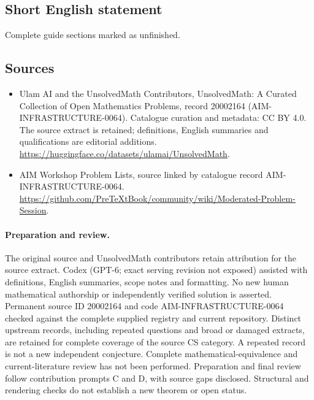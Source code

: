 \documentclass[11pt]{article}
\begin{document}
\subsection{Short English statement}
Complete guide sections marked as unfinished.
\subsection{Sources}
\begin{itemize}
\item[\hypertarget{source:20002164:1}{S1}] Ulam AI and the UnsolvedMath Contributors, UnsolvedMath: A Curated Collection of Open Mathematics Problems, record 20002164 (AIM-INFRASTRUCTURE-0064). Catalogue curation and metadata: CC BY 4.0. The source extract is retained; definitions, English summaries and qualifications are editorial additions.
\url{https://huggingface.co/datasets/ulamai/UnsolvedMath}.
\item[\hypertarget{source:20002164:2}{S2}] AIM Workshop Problem Lists, source linked by catalogue record AIM-INFRASTRUCTURE-0064.
\url{https://github.com/PreTeXtBook/community/wiki/Moderated-Problem-Session}.
\end{itemize}
\paragraph{Preparation and review.}
The original source and UnsolvedMath contributors retain attribution for the source extract. Codex (GPT-6; exact serving revision not exposed) assisted with definitions, English summaries, scope notes and formatting. No new human mathematical authorship or independently verified solution is asserted. Permanent source ID 20002164 and code AIM-INFRASTRUCTURE-0064 checked against the complete supplied registry and current repository. Distinct upstream records, including repeated questions and broad or damaged extracts, are retained for complete coverage of the source CS category. A repeated record is not a new independent conjecture. Complete mathematical-equivalence and current-literature review has not been performed. Preparation and final review follow contribution prompts C and D, with source gaps disclosed. Structural and rendering checks do not establish a new theorem or open status.
\label{end:20002164}
\end{document}
